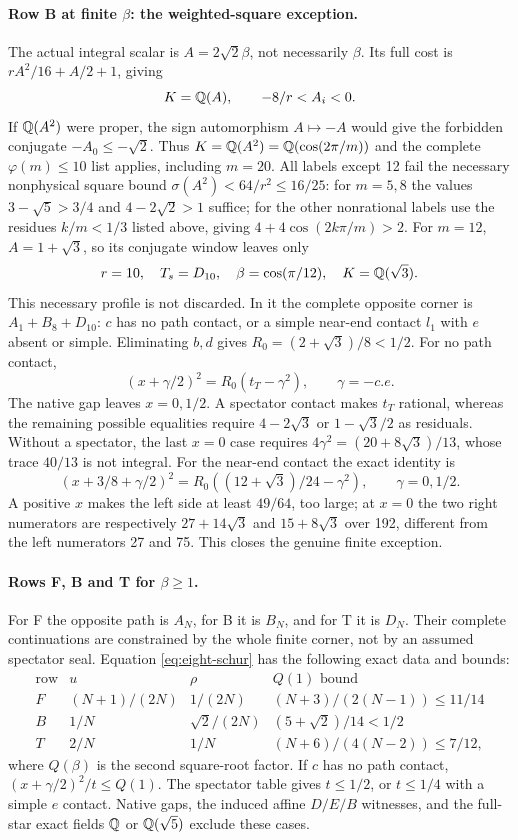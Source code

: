 \paragraph{Row B at finite $\beta$: the weighted-square exception.}
The actual integral scalar is $A=2\sqrt2\beta$, not necessarily
$\beta$. Its full cost is $rA^2/16+A/2+1$, giving
\[
 K=\mathbb Q(A),\qquad -8/r<A_i<0.
\]
If $\mathbb Q(A^2)$ were proper, the sign automorphism $A\mapsto-A$
would give the forbidden conjugate $-A_0\le-\sqrt2$.
Thus $K=\mathbb Q(A^2)=\mathbb Q(\cos(2\pi/m))$ and the complete
$\varphi(m)\le10$ list applies, including $m=20$.
All labels except 12 fail the necessary nonphysical square bound
$\sigma(A^2)<64/r^2\le16/25$: for $m=5,8$ the values
$3-\sqrt5>3/4$ and $4-2\sqrt2>1$ suffice; for the other
nonrational labels use the residues $k/m<1/3$ listed above,
giving $4+4\cos(2k\pi/m)>2$.
For $m=12$, $A=1+\sqrt3$, so its conjugate window leaves only
\[
 r=10,\quad T_s=D_{10},\quad \beta=\cos(\pi/12),\quad K=\mathbb Q(\sqrt3).
\]
This necessary profile is not discarded. In it the complete opposite
corner is $A_1+B_8+D_{10}$: $c$ has no path contact, or a simple
near-end contact $l_1$ with $e$ absent or simple. Eliminating $b,d$
gives $R_0=(2+\sqrt3)/8<1/2$. For no path contact,
\[
 (x+\gamma/2)^2=R_0(t_T-\gamma^2),\qquad \gamma=-c.e.
\]
The native gap leaves $x=0,1/2$. A spectator contact makes $t_T$
rational, whereas the remaining possible equalities require
$4-2\sqrt3$ or $1-\sqrt3/2$ as residuals. Without a spectator,
the last $x=0$ case requires
$4\gamma^2=(20+8\sqrt3)/13$, whose trace $40/13$ is not integral.
For the near-end contact the exact identity is
\[
 (x+3/8+\gamma/2)^2
 =R_0\left((12+\sqrt3)/24-\gamma^2\right),
 \qquad \gamma=0,1/2.
\]
A positive $x$ makes the left side at least $49/64$, too large;
at $x=0$ the two right numerators are respectively
$27+14\sqrt3$ and $15+8\sqrt3$ over 192, different from the
left numerators 27 and 75. This closes the genuine finite exception.

\paragraph{Rows F, B and T for $\beta\ge1$.}
For F the opposite path is $A_N$, for B it is $B_N$, and for T
it is $D_N$. Their complete continuations are constrained by the
whole finite corner, not by an assumed spectator seal. Equation
\eqref{eq:eight-schur} has the following exact data and bounds:
\[
\begin{array}{c|c|c|c}
\text{row}&u&\rho&Q(1)\text{ bound}\\\hline
F&(N+1)/(2N)&1/(2N)&(N+3)/(2(N-1))\le11/14\\
B&1/N&\sqrt2/(2N)&(5+\sqrt2)/14<1/2\\
T&2/N&1/N&(N+6)/(4(N-2))\le7/12,
\end{array}
\]
where $Q(\beta)$ is the second square-root factor. If $c$ has no
path contact, $(x+\gamma/2)^2/t\le Q(1)$. The spectator table
gives $t\le1/2$, or $t\le1/4$ with a simple $e$ contact. Native gaps,
the induced affine $D/E/B$ witnesses, and the full-star exact fields
$\mathbb Q$ or $\mathbb Q(\sqrt5)$ exclude these cases.

